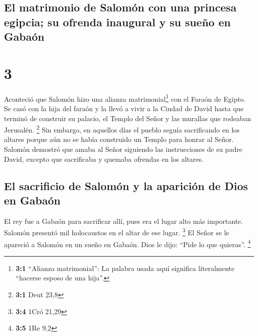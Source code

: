 \hypertarget{el-matrimonio-de-salomuxf3n-con-una-princesa-egipcia-su-ofrenda-inaugural-y-su-sueuxf1o-en-gabauxf3n}{%
\subsection{El matrimonio de Salomón con una princesa egipcia; su
ofrenda inaugural y su sueño en
Gabaón}\label{el-matrimonio-de-salomuxf3n-con-una-princesa-egipcia-su-ofrenda-inaugural-y-su-sueuxf1o-en-gabauxf3n}}

\hypertarget{section-2}{%
\section{3}\label{section-2}}

 Aconteció que Salomón hizo una alianza
matrimonial\footnote{\textbf{3:1} ``Alianza matrimonial'': La palabra
  usada aquí significa literalmente ``hacerse esposo de una hija''.} con
el Faraón de Egipto. Se casó con la hija del faraón y la llevó a vivir a
la Ciudad de David hasta que terminó de construir su palacio, el Templo
del Señor y las murallas que rodeaban Jerusalén. \footnote{\textbf{3:1}
  Deut 23,8}  Sin embargo, en aquellos días el pueblo
seguía sacrificando en los altares porque aún no se había construido un
Templo para honrar al Señor.  Salomón demostró que amaba
al Señor siguiendo las instrucciones de su padre David, excepto que
sacrificaba y quemaba ofrendas en los altares.

\hypertarget{el-sacrificio-de-salomuxf3n-y-la-apariciuxf3n-de-dios-en-gabauxf3n}{%
\subsection{El sacrificio de Salomón y la aparición de Dios en
Gabaón}\label{el-sacrificio-de-salomuxf3n-y-la-apariciuxf3n-de-dios-en-gabauxf3n}}

 El rey fue a Gabaón para sacrificar allí, pues era el
lugar alto más importante. Salomón presentó mil holocaustos en el altar
de ese lugar. \footnote{\textbf{3:4} 1Cró 21,29}  El Señor
se le apareció a Salomón en un sueño en Gabaón. Dios le dijo: ``Pide lo
que quieras''. \footnote{\textbf{3:5} 1Re 9,2}

